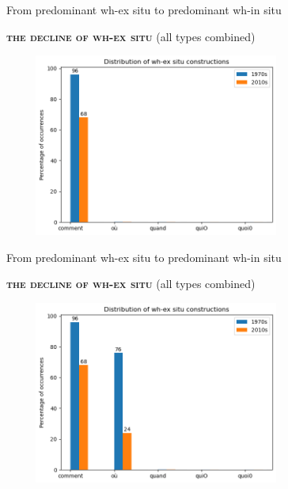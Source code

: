 \documentclass[lesson_slides]{subfiles}
\begin{document}
\begin{frame}[c]{From predominant wh-ex situ to predominant wh-in situ}

    \textbf{\textsc{the decline of wh-ex situ}} (all types combined)
    \begin{center}
        \includegraphics[width=10cm, height=6cm]{images/exsitu1.png}
    \end{center}
  
\end{frame}
\begin{frame}[c]{From predominant wh-ex situ to predominant wh-in situ}

    \textbf{\textsc{the decline of wh-ex situ}} (all types combined)
    \begin{center}
        \includegraphics[width=10cm, height=6cm]{images/exsitu2.png}
    \end{center}
  
\end{frame}
\end{document}

